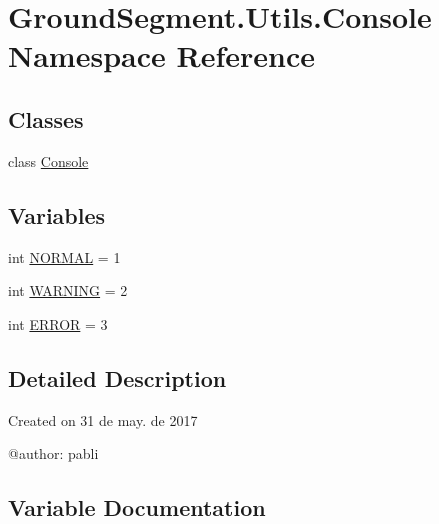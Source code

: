 \hypertarget{namespace_ground_segment_1_1_utils_1_1_console}{}\section{Ground\+Segment.\+Utils.\+Console Namespace Reference}
\label{namespace_ground_segment_1_1_utils_1_1_console}
\subsection*{Classes}
\begin{DoxyCompactItemize}
\item 
class \hyperlink{class_ground_segment_1_1_utils_1_1_console_1_1_console}{Console}
\end{DoxyCompactItemize}
\subsection*{Variables}
\begin{DoxyCompactItemize}
\item 
int \hyperlink{namespace_ground_segment_1_1_utils_1_1_console_a9e25c765b6540937c5954c92e0eb907c}{N\+O\+R\+M\+A\+L} = 1
\item 
int \hyperlink{namespace_ground_segment_1_1_utils_1_1_console_a93ee0e75b3a841100230c1f02abb053e}{W\+A\+R\+N\+I\+N\+G} = 2
\item 
int \hyperlink{namespace_ground_segment_1_1_utils_1_1_console_a39783203a68f20c36bcd7b259f88e566}{E\+R\+R\+O\+R} = 3
\end{DoxyCompactItemize}


\subsection{Detailed Description}
\begin{DoxyVerb}Created on 31 de may. de 2017

@author: pabli
\end{DoxyVerb}
 

\subsection{Variable Documentation}
\hypertarget{namespace_ground_segment_1_1_utils_1_1_console_a39783203a68f20c36bcd7b259f88e566}{}
